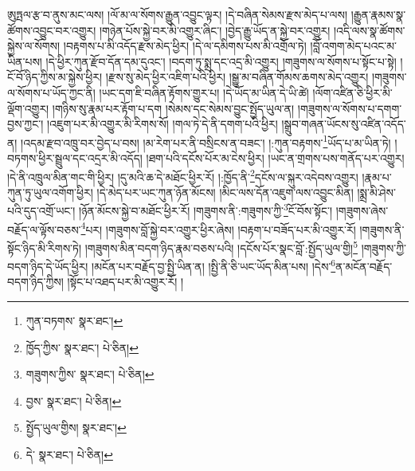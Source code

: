 ཨུཏྤལ་རྩ་བ་ནུས་མང་ལས། །ལོ་མ་ལ་སོགས་རྒྱུན་འབྱུང་ལྟར། །དེ་བཞིན་སེམས་རྫས་མེད་པ་ལས། །རྒྱུན་རྣམས་སྣ་ཚོགས་འབྱུང་བར་འགྱུར། །གཉེན་པོས་སྐྱེ་བར་མི་འགྱུར་ཞིང་། །བྱེད་རྒྱུ་ཡོད་ན་སྐྱེ་བར་འགྱུར། །འདི་ལས་སྣ་ཚོགས་སྐྱེས་ལ་སོགས། །བརྟགས་པ་མི་འདོད་རྫས་མེད་ཕྱིར། །དེ་ལ་དམིགས་པས་མི་འགྲོལ་ཏེ། །བློ་འགག་མེད་པའང་མ་ཡིན་པས། །དེ་ཕྱིར་ཀུན་རྫོབ་དོན་དམ་དུའང་། །བདག་ཏུ་སྨྲ་དང་འདྲ་མི་འགྱུར། །གཟུགས་ལ་སོགས་པ་སྟོང་པ་སྟེ། །ངོ་བོ་ཉིད་ཀྱིས་མ་སྐྱེས་ཕྱིར། །རྫས་སུ་མེད་ཕྱིར་འཇིག་པའི་ཕྱིར། །སྒྱུ་མ་བཞིན་གོམས་ཆགས་མེད་འགྱུར། །གཟུགས་ལ་སོགས་པ་ཡོད་ཀྱང་ནི། །ཡང་དག་ཇི་བཞིན་རྟོགས་གྱུར་པ། །དེ་ཡོད་མ་ཡིན་དེ་ཡི་ཚེ། །ལོག་འཛིན་ཅི་ཕྱིར་མི་ལྡོག་འགྱུར། །གཉིས་སུ་རྣམ་པར་རྟོག་པ་དག །སེམས་དང་སེམས་བྱུང་སྤྱོད་ཡུལ་ན། །གཟུགས་ལ་སོགས་པ་དགག་བྱས་ཀྱང་། །འཇུག་པར་མི་འགྱུར་མི་རིགས་སོ། །གལ་ཏེ་དེ་ནི་དགག་པའི་ཕྱིར། །སྒྲུབ་གཞན་ཡོངས་སུ་འཛིན་འདོད་ན། །འདམ་རྫབ་འཁྲུ་བར་བྱེད་པ་བས། །མ་རེག་པར་ནི་བསྲིངས་ན་བཟང་། །:ཀུན་བརྟགས་\footnote{ཀུན་བཏགས་  སྣར་ཐང་། }ཡོད་པ་མ་ཡིན་ཏེ། །བཏགས་ཕྱིར་སྦྲུལ་དང་འདྲར་མི་འདོད། །ཐག་པའི་དངོས་པོར་མ་ངེས་ཕྱིར། །ཡང་ན་གྲགས་པས་གནོད་པར་འགྱུར། །དེ་ནི་འཁྲུལ་མིན་གང་གི་ཕྱིར། །དུ་མའི་ཆ་དེ་མཐོང་ཕྱིར་རོ། །:ཁྱོད་ནི་\footnote{ཁྱོད་ཀྱིས་  སྣར་ཐང་།  པེ་ཅིན། }དངོས་ལ་སྐུར་འདེབས་འགྱུར། །རྣམ་པ་ཀུན་ཏུ་ཡུལ་འགོག་ཕྱིར། །དེ་མེད་པར་ཡང་ཀུན་ཉོན་མོངས། །མིང་ལས་དོན་འཇུག་ལས་འབྱུང་མིན། །སྨྲ་མི་ཤེས་པའི་དུད་འགྲོ་ཡང་། །ཉོན་མོངས་སྐྱེ་བ་མཐོང་ཕྱིར་རོ། །གཟུགས་ནི་:གཟུགས་ཀྱི་\footnote{གཟུགས་ཀྱིས་  སྣར་ཐང་།  པེ་ཅིན། }ངོ་བོས་སྟོང་། །གཟུགས་ཞེས་བརྗོད་ལ་ལྟོས་བཅས་\footnote{བྱས་  སྣར་ཐང་།  པེ་ཅིན། }པར། །གཟུགས་བློ་སྐྱེ་བར་འགྱུར་ཕྱིར་ཞེས། །བརྟག་པ་བཟོད་པར་མི་འགྱུར་རོ། །གཟུགས་ནི་སྟོང་ཉིད་མི་རིགས་ཏེ། །གཟུགས་མིན་བདག་ཉིད་རྣམ་བཅས་པའི། །དངོས་པོར་སྣང་བློ་:སྤྱོད་ཡུལ་གྱི།\footnote{སྤྱོད་ཡུལ་གྱིས།  སྣར་ཐང་། } །གཟུགས་ཀྱི་བདག་ཉིད་དེ་ཡོད་ཕྱིར། །མངོན་པར་བརྗོད་བྱ་སྤྱི་ཡིན་ན། །སྤྱི་ནི་ཅི་ཡང་ཡོད་མིན་པས། །དེས་\footnote{དེ་  སྣར་ཐང་།  པེ་ཅིན། }ན་མངོན་བརྗོད་བདག་ཉིད་ཀྱིས། །སྟོང་པ་འཐད་པར་མི་འགྱུར་རོ། །
